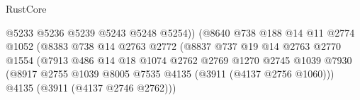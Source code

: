\begin{lexlean}{RustCore}
\begin{coremodule}
                                                  @5233
                                                  @5236
                                                  @5239
                                                  @5243
                                                  @5248
                                                  @5254))
                                              (@8640
                                                @738
                                                @188
                                                @14
                                                @11
                                                @2774
                                                @1052
                                                (@8383
                                                  @738
                                                  @14
                                                  @2763
                                                  @2772
                                                  (@8837
                                                    @737
                                                    @19
                                                    @14
                                                    @2763
                                                    @2770
                                                    @1554
                                                    (@7913
                                                      @486
                                                      @14
                                                      @18
                                                      @1074
                                                      @2762
                                                      @2769
                                                      @1270
                                                      @2745
                                                      @1039
                                                      @7930
                                                      (@8917
                                                        @2755
                                                        @1039
                                                        @8005
                                                        @7535
                                                        @4135
                                                        (@3911 (@4137 @2756 @1060)))
                                                      @4135
                                                      (@3911 (@4137 @2746 @2762)))

\end{coremodule}
\end{lexlean}
